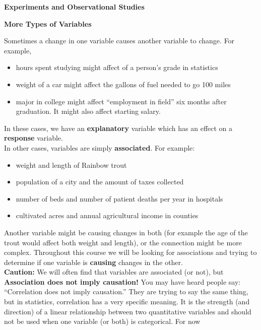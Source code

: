 \def\theTopic{Reading 8}

\begin{center}
  {\large\bf Experiments and Observational Studies}

  {\bf More Types of Variables}
\end{center}

Sometimes a change in one variable causes another variable to change. 
For example, \vspace{-.18in}
\begin{itemize}
\item hours spent studying might affect of a person's
grade in statistics
\item weight of a car might affect the gallons of fuel needed to go 100 miles
\item major in college might affect ``employment in field'' six months
  after graduation. It might also affect starting salary.
\end{itemize}
In these cases, we have an {\bf explanatory} variable which has an
effect on a  {\bf response} variable.  \\
In other cases, variables are simply {\bf associated}.  For example: \vspace{-.18in}
\begin{itemize}
\item weight and length of Rainbow trout
\item population of a city and the amount of taxes collected
\item number of beds  and  number of patient deaths per year
  in  hospitals
\item cultivated acres and annual agricultural income  in  counties
\end{itemize}
Another variable might be causing changes in both (for example the age
of the trout would affect both weight and length), or the connection might be
more complex.  Throughout this course we will be looking for
associations and trying to determine if one variable is {\bf causing}
changes in the other.  \\
{\bf Caution:} We will often find that variables are associated (or
  not), but {\bf Association does not imply causation!}   You may have
  heard people say: ``Correlation does not imply causation.''  They
  are trying to say the same thing, but in statistics, correlation has
  a very specific meaning. It is the strength (and direction) of a
  linear relationship between two quantitative variables and should
  not be used when one variable (or both) is categorical.  For now
